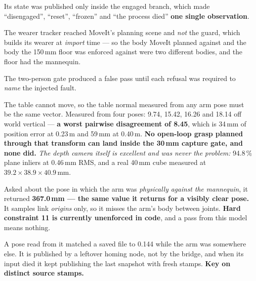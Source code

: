 {Its state was published only inside the engaged branch, which made
``disengaged'', ``reset'', ``frozen'' and ``the process died'' \textbf{one single
observation}.}

{The wearer tracker reached MoveIt's planning scene and \emph{not} the guard,
which builds its wearer at \emph{import} time --- so the body MoveIt planned
against and the body the 150\,mm floor was enforced against were two different
bodies, and the floor had the mannequin.}

{The two-person gate produced a false pass until each refusal was required to
\emph{name} the injected fault.}


{The table cannot move, so the table normal measured from any arm pose must be
the same vector. Measured from four poses: 9.74, 15.42, 16.26 and 18.14\dg{} off
world vertical --- \textbf{a worst pairwise disagreement of 8.45\dg}, which is
34\,mm of position error at 0.23\,m and 59\,mm at 0.40\,m. \textbf{No open-loop
grasp planned through that transform can land inside the 30\,mm capture gate, and
none did.} \emph{The depth camera itself is excellent and was never the problem:}
94.8\,\% plane inliers at 0.46\,mm RMS, and a real 40\,mm cube measured at
$39.2 \times 38.9 \times 40.9$\,mm.}

{Asked about the pose in which the arm was \emph{physically against the
mannequin}, it returned \textbf{367.0\,mm --- the same value it returns for a
visibly clear pose.} It samples link \emph{origins} only, so it misses the arm's
body between joints. \textbf{Hard constraint 11 is currently unenforced in
code}, and a pass from this model means nothing.}

{A pose read from it matched a saved file to 0.144\dg{} while the arm was
somewhere else. It is published by a leftover homing node, not by the bridge, and
when its input died it kept publishing the last snapshot with fresh stamps.
\textbf{Key on distinct source stamps.}}


